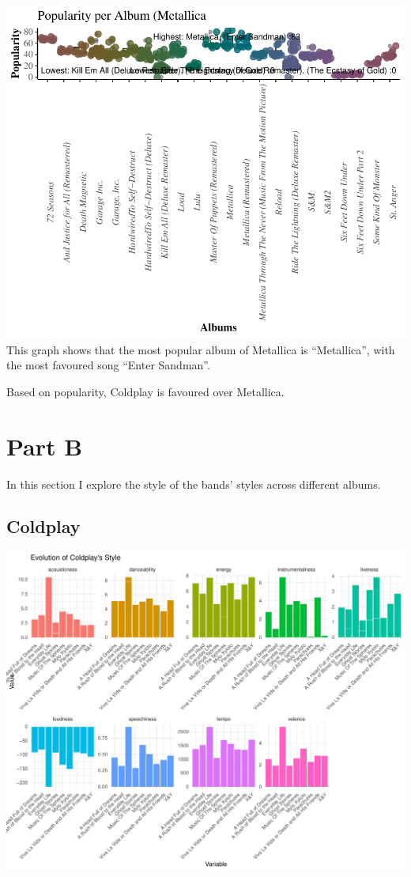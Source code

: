 \documentclass[11pt,preprint, authoryear]{elsarticle}
\numberwithin{equation}{section}
\numberwithin{figure}{section}
\numberwithin{table}{section}
\begin{document}
\includegraphics{Question3_files/figure-latex/unnamed-chunk-2-1.pdf}
This graph shows that the most popular album of Metallica is
``Metallica'', with the most favoured song ``Enter Sandman''.

Based on popularity, Coldplay is favoured over Metallica.

\hypertarget{part-b}{%
\section{Part B}\label{part-b}}

In this section I explore the style of the bands' styles across
different albums.

\hypertarget{coldplay-1}{%
\subsection{Coldplay}\label{coldplay-1}}

\includegraphics[angle=90]{Question3_files/figure-latex/unnamed-chunk-3-1}
\end{document}
